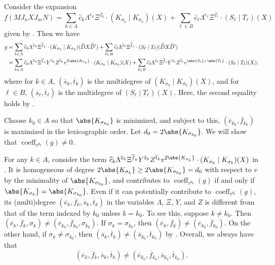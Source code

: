 \documentclass[10pt,a4paper]{amsart}
\DeclareMathOperator{\coeff}{coeff}
\begin{document}
\begin{pf}
Consider the expansion
\[
        f(M J_n X J_m N) = \sum_{k \in A} \widehat{c}_{k} \Lambda^{\overline{e}_k}\Xi^{\overline{f}_k}\cdot (K_{\sigma_k}\mid K_{\sigma_k})(X) + \sum_{\ell \in B} \widehat{c}_{\ell} \Lambda^{\overline{e}_\ell}\Xi^{\overline{f}_\ell}\cdot (S_\ell\mid T_\ell)(X)
\]
given by .
Then we have
\begin{equation}\label{eq:expansion-g}
\begin{aligned}
        g &= \sum_{k \in A} \widehat{c}_{k} \Lambda^{\overline{e}_k}\Xi^{\overline{f}_k}\cdot (K_{\sigma_k}\mid K_{\sigma_k})(\widetilde{D}X\widetilde{D}') + \sum_{\ell \in B} \widehat{c}_{\ell} \Lambda^{\overline{e}_\ell}\Xi^{\overline{f}_\ell}\cdot (S_\ell\mid T_\ell)(\widetilde{D}X\widetilde{D}')\\
        &=\sum_{k \in A} \widehat{c}_{k} \Lambda^{\overline{e}_k}\Xi^{\overline{f}_k}Y^{\overline{s}_k}Z^{\overline{t}_k}v^{2\abs{K_{\sigma_k}}}\cdot (K_{\sigma_k}\mid K_{\sigma_k})(X) + \sum_{\ell \in B} \widehat{c}_{\ell} \Lambda^{\overline{e}_\ell}\Xi^{\overline{f}_\ell}Y^{\overline{s}_\ell}Z^{\overline{t}_\ell}v^{\abs{S_\ell} + \abs{T_\ell}} \cdot (S_\ell\mid T_\ell)(X),
\end{aligned}
\end{equation}
where for $k\in A$, $(\overline{s}_k,\overline{t}_k)$ is the multidegree of $(K_{\sigma_k}\mid K_{\sigma_k})(X)$, and for $\ell \in B$, $(\overline{s}_\ell,\overline{t}_\ell)$ is the multidegree of $(S_\ell\mid T_\ell)(X)$.
Here, the second equality holds by .

Choose $k_0 \in A$ so that $\abs{K_{\sigma_{k_0}}}$ is minimized, and subject to this, $(\overline{e}_{k_0}, \overline{f}_{k_0})$ is maximized in the lexicographic order.
Let $d_0 = 2 \abs{K_{\sigma_{k_0}}}$.
We will show that $\coeff_{v^{d_0}}(g)\neq 0$.

For any $k\in A$, consider the term $\widehat{c}_{k} \Lambda^{\overline{e}_k}\Xi^{\overline{f}_k}Y^{\overline{s}_k}Z^{\overline{t}_k}v^{2\abs{K_{\sigma_k}}}\cdot (K_{\sigma_k}\mid K_{\sigma_k})(X)$ in .
It is homogeneous of degree $2 \abs{K_{\sigma_k}} \geq 2 \abs{K_{\sigma_{k_0}}} = d_0$ with respect to $v$ by the minimality of $\abs{K_{\sigma_{k_0}}}$, and contributes to $\coeff_{v^{d_0}}(g)$ if and only if $\abs{K_{\sigma_k}} = \abs{K_{\sigma_{k_0}}}$.
Even if it can potentially contribute to $\coeff_{v^{d_0}}(g)$, its (multi)degree $(\overline{e}_k,\overline{f}_k,\overline{s}_k,\overline{t}_k)$ in the variables $\Lambda$, $\Xi$, $Y$, and $Z$ is different from that of the term indexed by $k_0$ unless $k=k_0$.
To see this, suppose $k\neq k_0$.
Then $(\overline{e}_k,\overline{f}_k,\sigma_k)\neq (\overline{e}_{k_0},\overline{f}_{k_0},\sigma_{k_0})$.
If $\sigma_k=\sigma_{k_0}$, then $(\overline{e}_k,\overline{f}_k)\neq (\overline{e}_{k_0},\overline{f}_{k_0})$.
On the other hand, if $\sigma_k\neq \sigma_{k_0}$, then $(\overline{s}_k,\overline{t}_k)\neq (\overline{s}_{k_0},\overline{t}_{k_0})$ by .
Overall, we always have that 
\[
    (\overline{e}_k,\overline{f}_k,\overline{s}_k,\overline{t}_k)\neq (\overline{e}_{k_0},\overline{f}_{k_0},\overline{s}_{k_0},\overline{t}_{k_0}).
\]


\end{pf}
\end{document}
